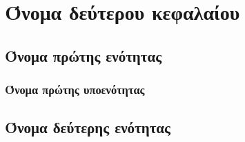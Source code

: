 
\chapter{Όνομα δεύτερου κεφαλαίου}


\section{Όνομα πρώτης ενότητας}

\subsection{Όνομα πρώτης υποενότητας}


\section{Όνομα δεύτερης ενότητας}








\endinput
